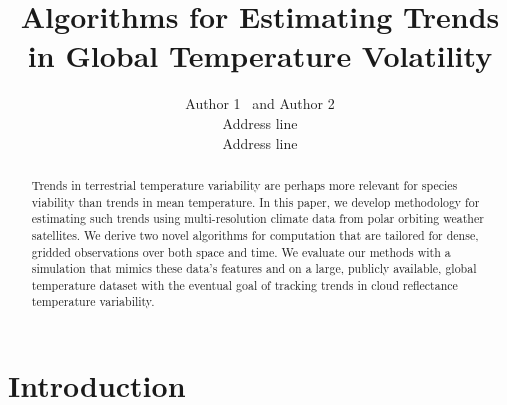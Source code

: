 \documentclass[letterpaper]{article} %
\begin{document}
 

\title{Algorithms for Estimating Trends in Global Temperature Volatility}

\author{Author 1 \ and Author 2\\
Address line\\
Address line
}





\maketitle


\begin{abstract}
Trends in terrestrial temperature variability are perhaps more relevant for species
viability than trends in mean
temperature. In this paper, we develop methodology for estimating such
trends using multi-resolution climate data from polar orbiting weather
satellites. We derive two novel algorithms for computation that are
tailored for dense, gridded observations over both 
space and time. We evaluate our methods with a simulation that mimics these data's 
features and on a large, publicly available, global
temperature dataset with the eventual goal of tracking trends in
cloud reflectance temperature variability.
\end{abstract}



\section{Introduction}

\end{document}

